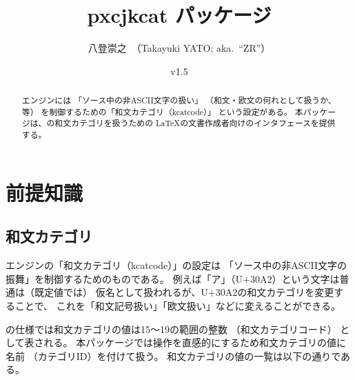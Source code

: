 \documentclass[uplatex,dvipdfmx,a4paper]{jsarticle}
\newcommand{\PkgVersion}{1.5}
\newcommand{\PkgDate}{2025/02/18}
\newcommand{\Pkg}[1]{\textsf{#1}}
\newcommand{\strong}{\textsf}
\begin{document}
\title{\Pkg{pxcjkcat} パッケージ}
\author{八登崇之\ （Takayuki YATO; aka.~``ZR''）}
\date{v\PkgVersion\quad[\PkgDate]}
\maketitle

\begin{abstract}
{\upTeX}エンジンには
「ソース中の非ASCII文字の扱い」
（和文・欧文の何れとして扱うか、等）
を制御するための「和文カテゴリ（kcatcode）」
という設定がある。
本パッケージは、{\upTeX}の和文カテゴリを扱うための
{\LaTeX}の文書作成者向けのインタフェースを提供する。
\end{abstract}

\tableofcontents

\section{前提知識}
\label{sec:Introduction}

\subsection{和文カテゴリ}
\label{ssec:cjkcategory}

{\upTeX}エンジンの「\strong{和文カテゴリ}（kcatcode）」の設定は
「ソース中の非ASCII文字の振舞」を制御するためのものである。
例えば「ア」（U+30A2）という文字は普通は（既定値では）
仮名として扱われるが、U+30A2の和文カテゴリを変更することで、
これを「和文記号扱い」「欧文扱い」などに変えることができる。

{\upTeX}の仕様では和文カテゴリの値は15～19の範囲の整数
（\strong{和文カテゴリコード}）
として表される。
本パッケージでは操作を直感的にするため和文カテゴリの値に名前
（\strong{カテゴリID}）を付けて扱う。
和文カテゴリの値の一覧は以下の通りである。
\end{document}
